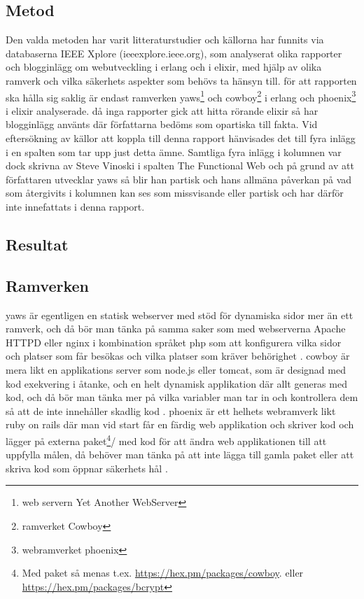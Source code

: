 \documentclass[12pt]{article}
\begin{document}
\subsection{ Metod}
Den valda metoden har varit 
litteraturstudier och källorna har funnits
 via databaserna IEEE Xplore 
 (ieeexplore.ieee.org), 
 som analyserat olika rapporter och 
blogginlägg om webutveckling i erlang och i elixir, med hjälp av olika ramverk och vilka säkerhets aspekter som behövs ta hänsyn till. för att rapporten ska hålla sig 
saklig är endast ramverken yaws\footnote{web servern Yet Another WebServer\cite{yawsorg}} och cowboy\footnote{ramverket Cowboy\cite{cowboyorg}} i erlang och phoenix\footnote{webramverket phoenix\cite{phoenixorg}} i elixir analyserade. då inga rapporter gick att hitta rörande elixir så har blogginlägg använts där författarna bedöms som opartiska till fakta. Vid eftersökning av källor att koppla till denna rapport hänvisades det till fyra inlägg 
i en spalten som tar upp just detta ämne. Samtliga fyra inlägg i kolumnen var dock skrivna av Steve Vinoski i spalten The Functional Web och på grund av att författaren utvecklar yaws så blir han partisk och hans allmäna påverkan på vad som återgivits i kolumnen kan ses som missvisande eller partisk och har därför inte innefattats i denna rapport.

\subsection{ Resultat}
\subsection*{Ramverken}
yaws är egentligen en statisk webserver med stöd för dynamiska sidor mer än ett ramverk, och då bör man tänka på samma saker som med webserverna Apache HTTPD eller nginx i kombination språket php som att konfigurera vilka sidor och platser som får besökas och vilka platser som kräver behörighet \cite{yaws}. cowboy är mera likt en applikations server som node.js eller tomcat, som är designad med kod exekvering i åtanke, och en helt dynamisk applikation där allt generas med kod, och då bör man tänka mer på vilka variabler man tar in och kontrollera dem så att de inte innehåller skadlig kod \cite{cowboy}. phoenix är ett helhets webramverk likt ruby on rails där man vid start får en färdig web applikation och skriver kod och lägger på externa paket\footnote{Med paket så menas t.ex. \url{https://hex.pm/packages/cowboy}.
eller \url{https://hex.pm/packages/bcrypt}}/ med kod för att ändra web applikationen till att uppfylla målen, då behöver man tänka på att inte lägga till gamla paket eller att skriva kod som öppnar säkerhets hål \cite{phoenix/ruby,phoenix/rails,phoenix}.
\end{document}
